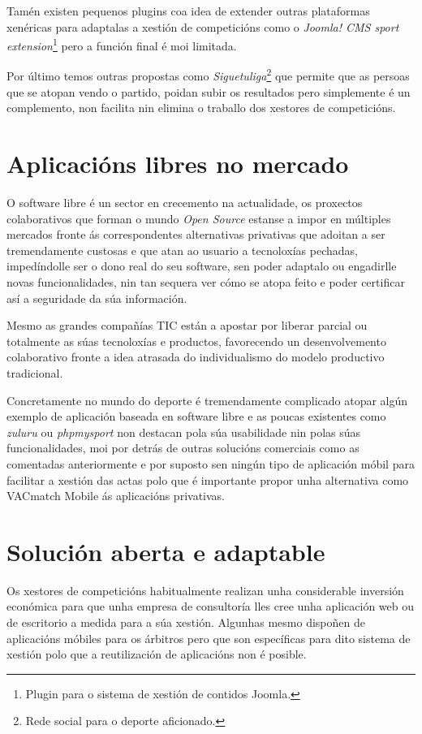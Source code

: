     Tamén existen pequenos plugins coa idea de extender outras plataformas 
xenéricas para adaptalas a xestión de competicións como o \emph{Joomla! CMS 
sport extension}\footnote{Plugin para o sistema de xestión de contidos Joomla.} 
pero a función final é moi limitada.

    Por último temos outras propostas como \emph{Siguetuliga}\footnote{Rede 
social para o deporte aficionado.} que permite que as persoas que se atopan 
vendo o partido, poidan subir os resultados pero simplemente é un complemento, 
non facilita nin elimina o traballo dos xestores de competicións.

  \section{Aplicacións libres no mercado}

    O software libre é un sector en crecemento na actualidade, os proxectos 
colaborativos que forman o mundo \emph{Open Source} estanse a impor en múltiples 
mercados fronte ás correspondentes alternativas privativas que adoitan a ser 
tremendamente custosas e que atan ao usuario a tecnoloxías pechadas, 
impedíndolle ser o dono real do seu software, sen poder adaptalo ou engadirlle 
novas funcionalidades, nin tan sequera ver cómo se atopa feito e poder 
certificar así a seguridade da súa información.

    Mesmo as grandes compañías TIC están a apostar por liberar parcial ou totalmente as 
súas tecnoloxías e productos, favorecendo un desenvolvemento colaborativo fronte a idea 
atrasada do individualismo do modelo productivo tradicional.

    Concretamente no mundo do deporte é tremendamente complicado atopar algún 
exemplo de aplicación baseada en software libre e as poucas existentes como 
\emph{zuluru} ou \emph{phpmysport} non destacan pola súa usabilidade nin polas 
súas funcionalidades, moi por detrás de outras solucións comerciais como as 
comentadas anteriormente e por suposto sen ningún tipo de aplicación móbil 
para facilitar a xestión das actas polo que é importante propor unha 
alternativa como VACmatch Mobile ás aplicacións privativas.

  \section{Solución aberta e adaptable}
  Os xestores de competicións habitualmente realizan unha considerable inversión 
económica para que unha empresa de consultoría lles cree unha aplicación web ou de 
escritorio a medida para a súa xestión. Algunhas mesmo dispoñen de aplicacións móbiles 
para os árbitros pero que son específicas para dito sistema de xestión polo que a 
reutilización de aplicacións non é posible.

